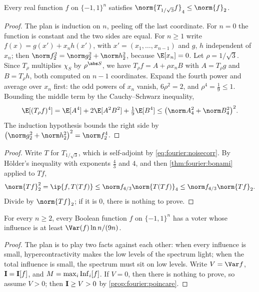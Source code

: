 \begin{refsection}
\begin{theorem}\label{thm:fourier:bonami}
Every real function $f$ on $\{-1,1\}^n$ satisfies $\norm{T_{1/\sqrt3}f}_4\le\norm{f}_2$.
\end{theorem}

\begin{proof}
The plan is induction on $n$, peeling off the last coordinate. For $n=0$ the function is constant and the two sides are equal. For $n\ge1$ write $f(x)=g(x')+x_nh(x')$, with $x'=(x_1,\dots,x_{n-1})$ and $g$, $h$ independent of $x_n$; then $\norm f_2^2=\norm g_2^2+\norm h_2^2$, because $\E[x_n]=0$. Let $\rho=1/\sqrt3$. Since $T_\rho$ multiplies $\chi_S$ by $\rho^{\abs S}$, we have $T_\rho f=A+\rho x_nB$ with $A=T_\rho g$ and $B=T_\rho h$, both computed on $n-1$ coordinates. Expand the fourth power and average over $x_n$ first: the odd powers of $x_n$ vanish, $6\rho^2=2$, and $\rho^4=\frac19\le1$. Bounding the middle term by the Cauchy--Schwarz inequality,
\[
  \E[(T_\rho f)^4]=\E[A^4]+2\E[A^2B^2]+\tfrac19\E[B^4]\le\bigl(\norm A_4^2+\norm B_4^2\bigr)^2 .
\]
The induction hypothesis bounds the right side by $\bigl(\norm g_2^2+\norm h_2^2\bigr)^2=\norm f_2^4$.
\end{proof}


\begin{proof}
Write $T$ for $T_{1/\sqrt3}$, which is self-adjoint by \eqref{eq:fourier:noisecorr}. By Hölder's inequality with exponents $\frac43$ and $4$, and then \cref{thm:fourier:bonami} applied to $Tf$,
\[
  \norm{Tf}_2^2=\ip{f,T(Tf)}\le\norm f_{4/3}\norm{T(Tf)}_4\le\norm f_{4/3}\norm{Tf}_2 .
\]
Divide by $\norm{Tf}_2$; if it is $0$, there is nothing to prove.
\end{proof}

\begin{theorem}\label{thm:fourier:kkl}
For every $n\ge2$, every Boolean function $f$ on $\{-1,1\}^n$ has a voter whose influence is at least $\Var(f)\ln n/(9n)$.
\end{theorem}

\begin{proof}
The plan is to play two facts against each other: when every influence is small, hypercontractivity makes the low levels of the spectrum light; when the total influence is small, the spectrum must sit on low levels. Write $V=\Var f$, $\mathbf{I}=\mathbf{I}[f]$, and $M=\max_i\operatorname{Inf}_i[f]$. If $V=0$, then there is nothing to prove, so assume $V>0$; then $\mathbf{I}\ge V>0$ by \cref{prop:fourier:poincare}.


\end{proof}
\end{refsection}
